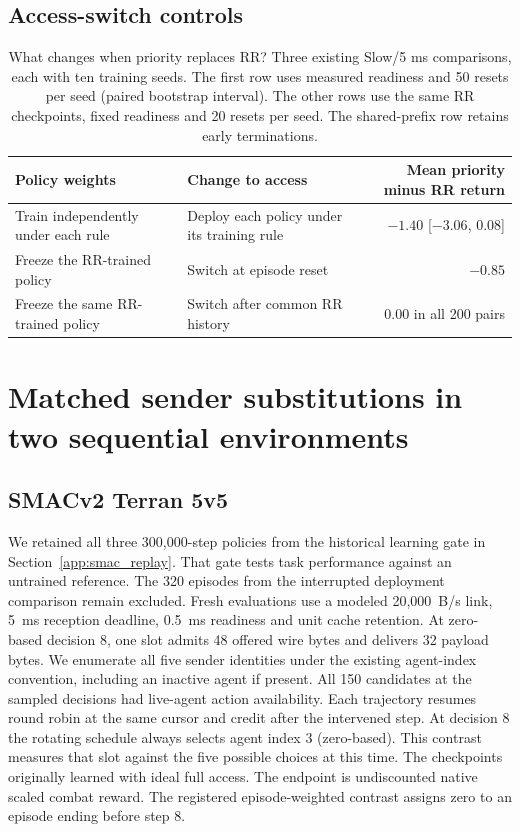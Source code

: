 \documentclass[pdflatex,sn-mathphys-num]{sn-jnl}
\begin{document}
\subsection{Access-switch controls}
\begin{table}[htbp]\centering\normalsize
\caption{What changes when priority replaces RR? Three existing Slow/5 ms comparisons, each with ten training seeds. The first row uses measured readiness and 50 resets per seed (paired bootstrap interval). The other rows use the same RR checkpoints, fixed readiness and 20 resets per seed. The shared-prefix row retains early terminations.}\label{tab:which_switch}
\begin{tabularx}{\textwidth}{@{}XXr@{}}
\toprule
Policy weights & Change to access & Mean priority minus RR return\\\midrule
Train independently under each rule & Deploy each policy under its training rule & $-1.40$ [$-3.06$, $0.08$]\\
Freeze the RR-trained policy & Switch at episode reset & $-0.85$\\
Freeze the same RR-trained policy & Switch after common RR history & $0.00$ in all 200 pairs\\
\bottomrule
\end{tabularx}
\end{table}



\FloatBarrier
\FloatBarrier
\section{Matched sender substitutions in two sequential environments}\label{app:sequential}
\subsection{SMACv2 Terran 5v5}
We retained all three 300,000-step policies from the historical learning gate in Section~\ref{app:smac_replay}. That gate tests task performance against an untrained reference. The 320 episodes from the interrupted deployment comparison remain excluded. Fresh evaluations use a modeled 20,000~B/s link, 5~ms reception deadline, 0.5~ms readiness and unit cache retention. At zero-based decision 8, one slot admits 48 offered wire bytes and delivers 32 payload bytes. We enumerate all five sender identities under the existing agent-index convention, including an inactive agent if present. All 150 candidates at the sampled decisions had live-agent action availability. Each trajectory resumes round robin at the same cursor and credit after the intervened step. At decision 8 the rotating schedule always selects agent index 3 (zero-based). This contrast measures that slot against the five possible choices at this time. The checkpoints originally learned with ideal full access. The endpoint is undiscounted native scaled combat reward. The registered episode-weighted contrast assigns zero to an episode ending before step 8.
\end{document}
